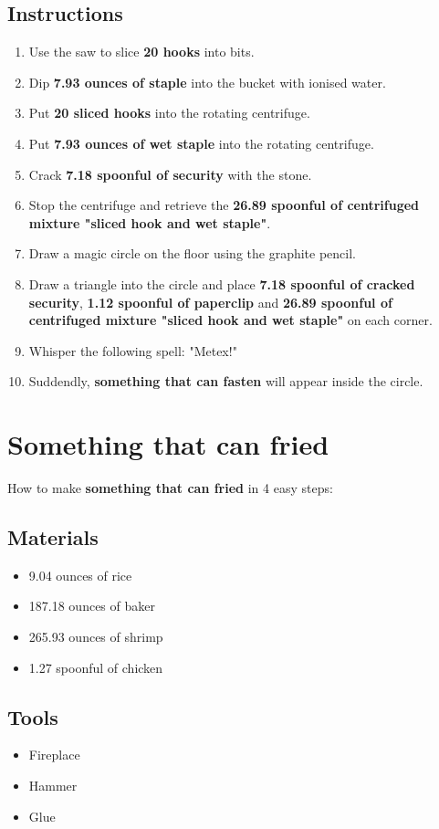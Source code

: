 \documentclass{article}
\begin{document}
\subsection{Instructions}\begin{enumerate}
\item 
Use the saw to slice \textbf{20 hooks} into bits.
\item 
Dip \textbf{7.93 ounces of staple} into the bucket with ionised water.
\item 
Put \textbf{20 sliced hooks} into the rotating centrifuge.
\item 
Put \textbf{7.93 ounces of wet staple} into the rotating centrifuge.
\item 
Crack \textbf{7.18 spoonful of security} with the stone.
\item 
Stop the centrifuge and retrieve the \textbf{26.89 spoonful of centrifuged mixture "sliced hook and wet staple"}.
\item 
Draw a magic circle on the floor using the graphite pencil.
\item 
Draw a triangle into the circle and place \textbf{7.18 spoonful of cracked security}, \textbf{1.12 spoonful of paperclip} and \textbf{26.89 spoonful of centrifuged mixture "sliced hook and wet staple"} on each corner.
\item 
Whisper the following spell: "Metex!"
\item 
Suddendly, \textbf{something that can fasten} will appear inside the circle.
\end{enumerate}
\newpage
\section{Something that can fried}How to make \textbf{something that can fried} in 4 easy steps:

\subsection{Materials}\begin{itemize}
\item 
9.04 ounces of rice
\item 
187.18 ounces of baker
\item 
265.93 ounces of shrimp
\item 
1.27 spoonful of chicken
\end{itemize}
\subsection{Tools}\begin{itemize}
\item 
Fireplace
\item 
Hammer
\item 
Glue
\end{itemize}
\end{document}
